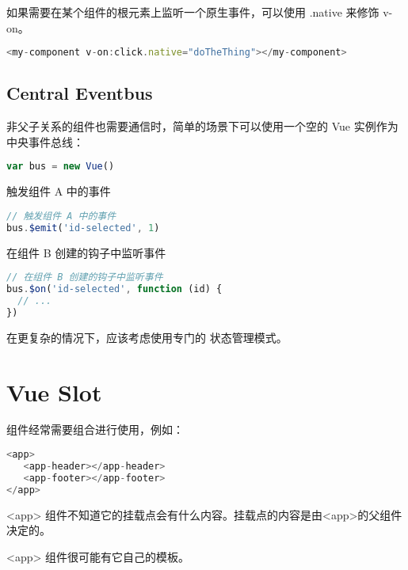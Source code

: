 如果需要在某个组件的根元素上监听一个原生事件，可以使用 .native 来修饰 v-on。


\begin{lstlisting}[language=JavaScript]
<my-component v-on:click.native="doTheThing"></my-component>
\end{lstlisting}



\section{Central Eventbus}

非父子关系的组件也需要通信时，简单的场景下可以使用一个空的 Vue 实例作为中央事件总线：



\begin{lstlisting}[language=JavaScript]
var bus = new Vue()
\end{lstlisting}

\begin{compactitem}
\item 触发组件 A 中的事件

\begin{lstlisting}[language=JavaScript]
// 触发组件 A 中的事件
bus.$emit('id-selected', 1)
\end{lstlisting}

\item 在组件 B 创建的钩子中监听事件

\begin{lstlisting}[language=JavaScript]
// 在组件 B 创建的钩子中监听事件
bus.$on('id-selected', function (id) {
  // ...
})
\end{lstlisting}
\end{compactitem}

在更复杂的情况下，应该考虑使用专门的 状态管理模式。


\chapter{Vue Slot}

组件经常需要组合进行使用，例如：

\begin{lstlisting}[language=JavaScript]
<app>
   <app-header></app-header>
   <app-footer></app-footer>
</app>
\end{lstlisting}

\begin{compactitem}
\item <app> 组件不知道它的挂载点会有什么内容。挂载点的内容是由<app>的父组件决定的。
\item <app> 组件很可能有它自己的模板。
\end{compactitem}

